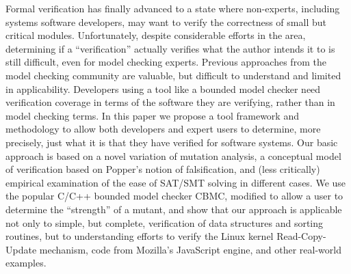 Formal verification has finally advanced to a state where non-experts, including systems software developers, may want to verify the correctness of small but critical modules.  Unfortunately, despite considerable efforts in the area, determining if a ``verification'' actually verifies what the author intends it to is still difficult, even for model checking experts.  Previous approaches from the model checking community are valuable, but difficult to understand and limited in applicability.  Developers using a tool like a bounded model checker need verification coverage in terms of the software they are verifying, rather than in model checking terms.  In this paper we propose a tool framework and methodology to allow both developers and expert users to determine, more precisely, just what it is that they have verified for software systems.  Our basic approach is based on a novel variation of mutation analysis, a conceptual model of verification based on Popper's notion of falsification, and (less critically) empirical examination of the ease of SAT/SMT solving in different cases.  We use the popular C/C++ bounded model checker CBMC, modified to allow a user to determine the ``strength'' of a mutant, and show that our approach is applicable not only to simple, but complete, verification of data structures and sorting routines, but to understanding efforts to verify the Linux kernel Read-Copy-Update mechanism, code from Mozilla's JavaScript engine, and other real-world examples.
